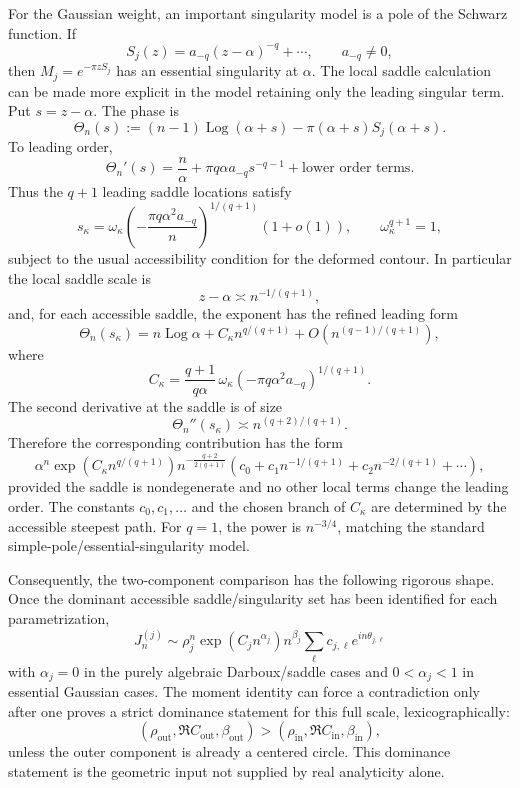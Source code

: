 \documentclass[11pt]{article}
\newcommand{\1}{\mathbf 1}
\newcommand{\Log}{\operatorname{Log}}
\begin{document}
For the Gaussian weight, an important singularity model is a pole of the Schwarz function.
If
\[
  S_j(z)=a_{-q}(z-\alpha)^{-q}+\cdots,
  \qquad a_{-q}\ne0,
\]
then \(M_j=e^{-\pi zS_j}\) has an essential singularity at \(\alpha\). The local saddle
calculation can be made more explicit in the model retaining only the leading singular
term. Put \(s=z-\alpha\). The phase is
\[
  \Theta_n(s):=(n-1)\Log(\alpha+s)-\pi(\alpha+s)S_j(\alpha+s).
\]
To leading order,
\[
  \Theta_n'(s)
  =
  \frac{n}{\alpha}
  +
  \pi q\alpha a_{-q}s^{-q-1}
  +\text{lower order terms}.
\]
Thus the \(q+1\) leading saddle locations satisfy
\begin{equation}\label{eq:essential-saddle-locations}
  s_\kappa
  =
  \omega_\kappa
  \left(-\frac{\pi q\alpha^2a_{-q}}{n}\right)^{1/(q+1)}
  \left(1+o(1)\right),
  \qquad \omega_\kappa^{q+1}=1,
\end{equation}
subject to the usual accessibility condition for the deformed contour. In particular the
local saddle scale is
\[
  z-\alpha\asymp n^{-1/(q+1)},
\]
and, for each accessible saddle, the exponent has the refined leading form
\begin{equation}\label{eq:essential-exponent}
  \Theta_n(s_\kappa)
  =
  n\Log\alpha
  +
  C_\kappa n^{q/(q+1)}
  +O(n^{(q-1)/(q+1)}),
\end{equation}
where
\[
  C_\kappa
  =
  \frac{q+1}{q\alpha}\,
  \omega_\kappa
  \left(-\pi q\alpha^2a_{-q}\right)^{1/(q+1)}.
\]
The second derivative at the saddle is of size
\[
  \Theta_n''(s_\kappa)\asymp n^{(q+2)/(q+1)}.
\]
Therefore the corresponding contribution has the form
\begin{equation}\label{eq:essential-form-param}
  \alpha^n
  \exp\!\left(C_\kappa n^{q/(q+1)}\right)
  n^{-\frac{q+2}{2(q+1)}}
  \left(c_0+c_1n^{-1/(q+1)}+c_2n^{-2/(q+1)}+\cdots\right),
\end{equation}
provided the saddle is nondegenerate and no other local terms change the leading order.
The constants \(c_0,c_1,\dots\) and the chosen branch of \(C_\kappa\) are determined by the
accessible steepest path. For \(q=1\), the power is \(n^{-3/4}\), matching the standard
simple-pole/essential-singularity model.

Consequently, the two-component comparison has the following rigorous shape. Once the
dominant accessible saddle/singularity set has been identified for each parametrization,
\[
  J_n^{(j)}
  \sim
  \rho_j^n
  \exp\!\left(C_j n^{\alpha_j}\right)
  n^{\beta_j}
  \sum_\ell c_{j,\ell}e^{in\theta_{j,\ell}}
\]
with \(\alpha_j=0\) in the purely algebraic Darboux/saddle cases and
\(0<\alpha_j<1\) in essential Gaussian cases. The moment identity can force a
contradiction only after one proves a strict dominance statement for this full scale,
lexicographically:
\[
  (\rho_{\mathrm{out}},\Re C_{\mathrm{out}},\beta_{\mathrm{out}})
  >
  (\rho_{\mathrm{in}},\Re C_{\mathrm{in}},\beta_{\mathrm{in}}),
\]
unless the outer component is already a centered circle. This dominance statement is the
geometric input not supplied by real analyticity alone.
\end{document}
